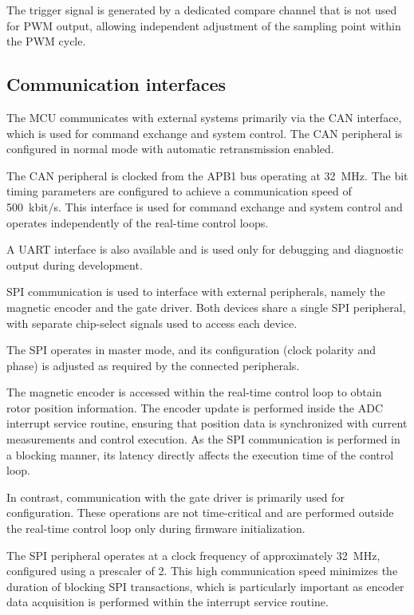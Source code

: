 The trigger signal is generated by a dedicated compare channel that is not used for PWM output, 
allowing independent adjustment of the sampling point within the PWM cycle.

\subsection{Communication interfaces}
The MCU communicates with external systems primarily via the CAN interface, which is used for command exchange and system control. 
The CAN peripheral is configured in normal mode with automatic retransmission enabled.

The CAN peripheral is clocked from the APB1 bus operating at 32~MHz. 
The bit timing parameters are configured to achieve a communication speed of 500~kbit/s. 
This interface is used for command exchange and system control and operates independently of the real-time control loops.

A UART interface is also available and is used only for debugging and diagnostic output during development.

SPI communication is used to interface with external peripherals, namely the magnetic encoder and the gate driver. 
Both devices share a single SPI peripheral, with separate chip-select signals used to access each device.

The SPI operates in master mode, and its configuration (clock polarity and phase) is adjusted as required by the connected peripherals.

The magnetic encoder is accessed within the real-time control loop to obtain rotor position information. 
The encoder update is performed inside the ADC interrupt service routine, 
ensuring that position data is synchronized with current measurements and control execution. 
As the SPI communication is performed in a blocking manner, its latency directly affects the execution time of the control loop.

In contrast, communication with the gate driver is primarily used for configuration. 
These operations are not time-critical and are performed outside the real-time control loop only during firmware initialization.

The SPI peripheral operates at a clock frequency of approximately 32~MHz, 
configured using a prescaler of 2. This high communication speed minimizes the duration of blocking SPI transactions, 
which is particularly important as encoder data acquisition is performed within the interrupt service routine.

